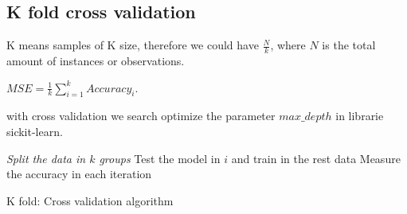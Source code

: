 \documentclass[10pt,a4paper]{article}
\begin{document}
\subsection{K fold cross validation}

K means samples of K size, therefore we could have $\frac{N}{k}$, where $N$ is the total amount of instances or observations.

$MSE = \frac{1}{k} \sum_{i=1}^{k}Accuracy_{i}$.

with cross validation we search optimize the parameter $max\_depth$ in librarie sickit-learn.







\begin{algorithm}[H]
\SetAlgoLined
{}
\emph{Split the data in $k$ groups 
\;}
{Test the model in $i$ and train in the rest data \;
Measure the accuracy in each iteration \;}
\caption{K fold: Cross validation algorithm}
\end{algorithm}
\end{document}
